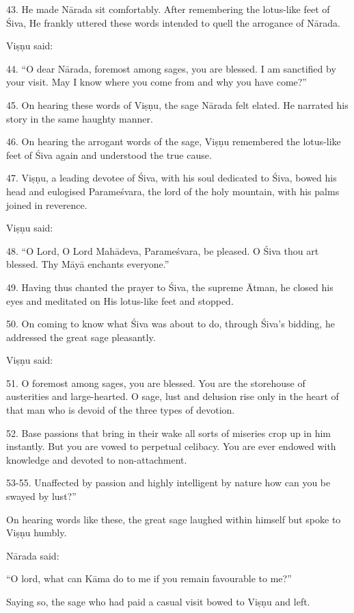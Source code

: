 43. He made Nārada sit comfortably. After remembering the lotus-like feet of
Śiva, He frankly uttered these words intended to quell the arrogance of Nārada.

Viṣṇu said:

44. “O dear Nārada, foremost among sages, you are blessed. I am sanctified by
your visit. May I know where you come from and why you have come?”

45. On hearing these words of Viṣṇu, the sage Nārada felt elated. He narrated
his story in the same haughty manner.

46. On hearing the arrogant words of the sage, Viṣṇu remembered the lotus-like
feet of Śiva again and understood the true cause.

47. Viṣṇu, a leading devotee of Śiva, with his soul dedicated to Śiva, bowed his
head and eulogised Parameśvara, the lord of the holy mountain, with his palms
joined in reverence.

Viṣṇu said:

48. “O Lord, O Lord Mahādeva, Parameśvara, be pleased. O Śiva thou art blessed.
Thy Māyā enchants everyone.”

49. Having thus chanted the prayer to Śiva, the supreme Ātman, he closed his
eyes and meditated on His lotus-like feet and stopped.

50. On coming to know what Śiva was about to do, through Śiva’s bidding, he
addressed the great sage pleasantly.

Viṣṇu said:

51. O foremost among sages, you are blessed. You are the storehouse of
austerities and large-hearted. O sage, lust and delusion rise only in the heart
of that man who is devoid of the three types of devotion.

52. Base passions that bring in their wake all sorts of miseries crop up in him
instantly. But you are vowed to perpetual celibacy. You are ever endowed with
knowledge and devoted to non-attachment.

53-55. Unaffected by passion and highly intelligent by nature how can you be
swayed by lust?”

On hearing words like these, the great sage laughed within himself but spoke to
Viṣṇu humbly.

Nārada said:

“O lord, what can Kāma do to me if you remain favourable to me?”

Saying so, the sage who had paid a casual visit bowed to Viṣṇu and left.
